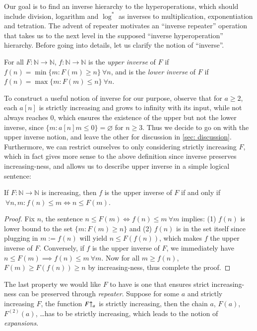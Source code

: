 Our goal is to find an inverse hierarchy to the hyperoperations, which should include division, logarithm and $\log^*$ as inverses to multiplication, exponentiation and tetration. The advent of repeater motivates an ``inverse repeater'' operation that takes us to the next level in the supposed ``inverse hyperoperation'' hierarchy. Before going into details, let us clarify the notion of ``inverse''.
\begin{defn} \label{defn: inverse}
	For all $F:\mathbb{N}\to \mathbb{N}$, $f:\mathbb{N}\to \mathbb{N}$ is the \emph{upper inverse} of $F$ if $f(n) = \min\{m : F(m)\ge n\} \ \forall n$, and is the \emph{lower inverse} of $F$ if $f(n) = \max\{m : F(m)\le n\} \ \forall n$.
\end{defn}
To construct a useful notion of inverse for our purpose, observe that for $a\ge 2$, each $a[n]$ is strictly increasing and grows to infinity with its input, while not always reaches $0$, which ensures the existence of the upper but not the lower inverse, since $\{m : a[n]m \le 0 \} = \varnothing$ for $n\ge 3$. Thus we decide to go on with the upper inverse notion, and leave the other for discussion in \cref{sec: discussion}. Furthermore, we can restrict ourselves to only considering strictly increasing $F$, which in fact gives more sense to the above definition since inverse preserves increasing-ness, and allows us to describe upper inverse in a simple logical sentence:
\begin{thm} \label{thm: upp-inverse-rel}
	If $F:\mathbb{N}\to \mathbb{N}$ is increasing, then $f$ is the upper inverse of $F$ if and only if $\ \forall n, m : f(n)\le m \iff n \le F(m)$.
\end{thm}
\begin{proof}
Fix $n$, the sentence $n\le F(m) \iff f(n)\le m \ \forall m$ implies: (1) $f(n)$ is lower bound to the set $\{m: F(m)\ge n \}$ and (2) $f(n)$ is in the set itself since plugging in $m := f(n)$ will yield $n\le F(f(n))$, which makes $f$ the upper inverse of $F$. Conversely, if $f$ is the upper inverse of $F$, we immediately have $n\le F(m)\implies f(n)\le m \ \forall m$. Now for all $m \ge f(n)$, $F(m)\ge F(f(n)) \ge n$ by increasing-ness, thus complete the proof.
\end{proof}
The last property we would like $F$ to have is one that ensures strict increasing-ness can be preserved through \emph{repeater}. Suppose for some $a$ and strictly increasing $F$, the function $\rf{F}{a}\ $ is strictly increasing, then the chain $a$, $F(a)$, $F^{(2)}(a)$, \ldots has to be strictly increasing, which leads to the notion of \emph{expansions}.
